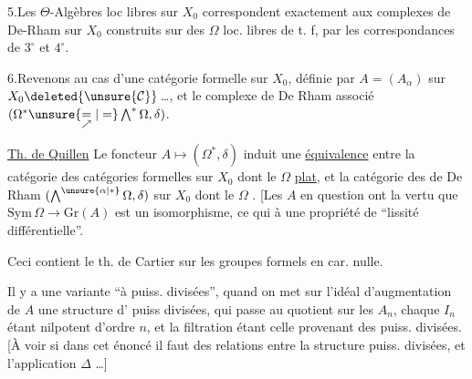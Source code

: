 5.\quad Les $\Theta$-Algèbres loc libres  sur $X_0$ correspondent exactement aux complexes de De-Rham sur $X_0$ construits sur des $\Omega$ loc. libres de t. f, par les correspondances de $3^\circ$ et $4^\circ$.

6.\quad Revenons au cas d'une catégorie formelle sur $X_0$, définie par $A=(A_\alpha)$ sur $X_0\deleted{\unsure{\mathcal C}}$\,\ldots, et le complexe de De Rham associé $(\Omega^*\unsure{\underset{\nearrow}{=}|=}\bigwedge^*\Omega,\delta)$.

\uline{Th. de Quillen}  Le foncteur $A\longmapsto(\Omega^*,\delta)$ induit une \uline{équivalence} entre la catégorie des catégories formelles  sur $X_0$ dont le $\Omega$  \uline{plat}, et la catégorie des  de De Rham $(\bigwedge^{\unsure{\alpha|*}}\Omega,\delta)$ sur $X_0$ dont le $\Omega$  . [Les $A$ en question ont la vertu que $\mathrm{Sym}\,\Omega\longrightarrow\mathrm{Gr}(A)$ est un isomorphisme, ce qui  à une propriété de ``lissité différentielle''.

Ceci contient le th. de Cartier sur les groupes formels en car. nulle.

Il y a une variante ``à puiss. divisées'', quand on met sur l'idéal d'augmentation de $A$  une structure d' puiss divisées, qui passe au quotient sur les $A_n$, chaque $I_n$ étant nilpotent d'ordre $n$, et la filtration étant celle provenant des puiss. divisées. [À voir si dans cet énoncé il faut  des relations entre la structure  puiss. divisées, et l'application $\Delta$ \ldots]


